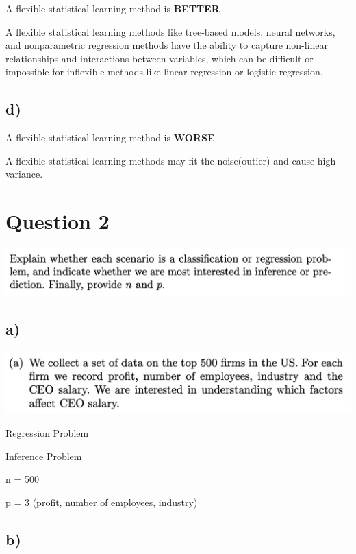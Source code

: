 \documentclass[
]{article}
\begin{document}
A flexible statistical learning method is \textbf{BETTER}

A flexible statistical learning methods like tree-based models, neural
networks, and nonparametric regression methods have the ability to
capture non-linear relationships and interactions between variables,
which can be difficult or impossible for inflexible methods like linear
regression or logistic regression.

\hypertarget{d}{%
\subsection{d)}\label{d}}

A flexible statistical learning method is \textbf{WORSE}

A flexible statistical learning methods may fit the noise(outier) and
cause high variance.

\hypertarget{question-2}{%
\section{Question 2}\label{question-2}}

\includegraphics{images/image-2069609319.png}

\hypertarget{a-1}{%
\subsection{a)}\label{a-1}}

\includegraphics{images/image-1100398168.png}

Regression Problem

Inference Problem

n = 500

p = 3 (profit, number of employees, industry)

\hypertarget{b-1}{%
\subsection{b)}\label{b-1}}
\end{document}
